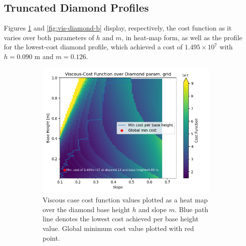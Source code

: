\documentclass[11pt]{article}
\begin{document}
\subsection{Truncated Diamond Profiles}
Figures \ref{fig:vis-diamond-a} and \ref{fig:vis-diamond-b} display, respectively, the cost function as it varies over both parameters of $h$ and $m$, in heat-map form, as well as the profile for the lowest-cost diamond profile, which achieved a cost of $1.495\times 10^7$ with $h=0.090 \text{ m}$ and $m=0.126$.
\begin{figure}[H]
\centering
\begin{subfigure}[b]{0.54\textwidth}
    \centering
    \includegraphics[width=\linewidth]{../results/viscous/diamonds.png}
    \caption{Viscous case cost function values plotted as a heat map over the diamond base height $h$ and slope $m$. Blue path line denotes the lowest cost achieved per base height value. Global minimum cost value plotted with red point.}
    \label{fig:vis-diamond-a}
\end{subfigure}
\hfill
\begin{subfigure}[b]{0.44\textwidth}
    \centering

\end{subfigure}
\end{figure}
\end{document}
